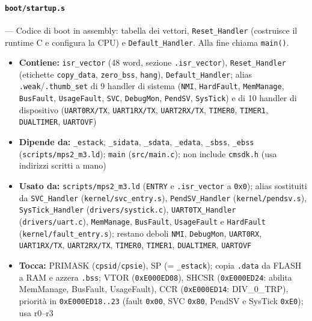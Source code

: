 \paragraph{\texttt{boot/startup.s}} --- Codice di boot in assembly: tabella dei vettori, \texttt{Reset\_Handler} (costruisce il runtime C e configura la CPU) e \texttt{Default\_Handler}. Alla fine chiama \texttt{main()}.
\begin{itemize}
  \item \textbf{Contiene:} \texttt{isr\_vector} (48 word, sezione \texttt{.isr\_vector}), \texttt{Reset\_Handler} (etichette \texttt{copy\_data}, \texttt{zero\_bss}, \texttt{hang}), \texttt{Default\_Handler}; alias \texttt{.weak}/\texttt{.thumb\_set} di 9 handler di sistema (\texttt{NMI}, \texttt{HardFault}, \texttt{MemManage}, \texttt{BusFault}, \texttt{UsageFault}, \texttt{SVC}, \texttt{DebugMon}, \texttt{PendSV}, \texttt{SysTick}) e di 10 handler di dispositivo (\texttt{UART0RX/TX}, \texttt{UART1RX/TX}, \texttt{UART2RX/TX}, \texttt{TIMER0}, \texttt{TIMER1}, \texttt{DUALTIMER}, \texttt{UARTOVF})
  \item \textbf{Dipende da:} \texttt{\_estack}, \texttt{\_sidata}, \texttt{\_sdata}, \texttt{\_edata}, \texttt{\_sbss}, \texttt{\_ebss} (\texttt{scripts/mps2\_m3.ld}); \texttt{main} (\texttt{src/main.c}); non include \texttt{cmsdk.h} (usa indirizzi scritti a mano)
  \item \textbf{Usato da:} \texttt{scripts/mps2\_m3.ld} (\texttt{ENTRY} e \texttt{.isr\_vector} a \texttt{0x0}); alias sostituiti da \texttt{SVC\_Handler} (\texttt{kernel/svc\_entry.s}), \texttt{PendSV\_Handler} (\texttt{kernel/pendsv.s}), \texttt{SysTick\_Handler} (\texttt{drivers/systick.c}), \texttt{UART0TX\_Handler} (\texttt{drivers/uart.c}), \texttt{MemManage}, \texttt{BusFault}, \texttt{UsageFault} e \texttt{HardFault} (\texttt{kernel/fault\_entry.s}); restano deboli \texttt{NMI}, \texttt{DebugMon}, \texttt{UART0RX}, \texttt{UART1RX/TX}, \texttt{UART2RX/TX}, \texttt{TIMER0}, \texttt{TIMER1}, \texttt{DUALTIMER}, \texttt{UARTOVF}
  \item \textbf{Tocca:} PRIMASK (\texttt{cpsid}/\texttt{cpsie}), SP (= \texttt{\_estack}); copia \texttt{.data} da FLASH a RAM e azzera \texttt{.bss}; VTOR (\texttt{0xE000ED08}), SHCSR (\texttt{0xE000ED24}: abilita MemManage, BusFault, UsageFault), CCR (\texttt{0xE000ED14}: DIV\_0\_TRP), priorità in \texttt{0xE000ED18..23} (fault \texttt{0x00}, SVC \texttt{0x80}, PendSV e SysTick \texttt{0xE0}); usa r0--r3
\end{itemize}

